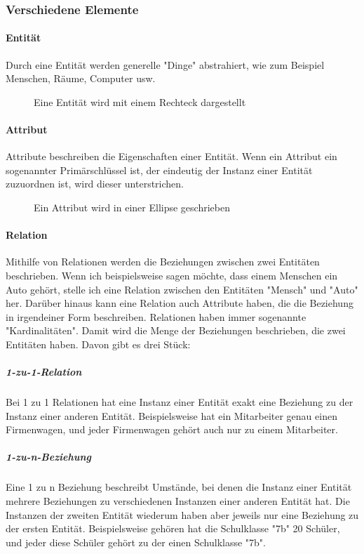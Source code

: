 \documentclass{article}
\begin{document}
	\subsubsection{Verschiedene Elemente}
	\paragraph{Entität}
	Durch eine Entität werden generelle "Dinge" abstrahiert, wie zum Beispiel Menschen, Räume, Computer usw.

	\begin{figure}[h!]
		\caption{Eine Entität wird mit einem Rechteck dargestellt}
	\end{figure}	

	\paragraph{Attribut}
	Attribute beschreiben die Eigenschaften einer Entität. Wenn ein Attribut ein sogenannter Primärschlüssel ist, der eindeutig der Instanz einer Entität zuzuordnen ist, wird dieser unterstrichen.

	\begin{figure}[h!]
		\centering
		
		\caption{Ein Attribut wird in einer Ellipse geschrieben}
	\end{figure}	

	\paragraph{Relation}
	Mithilfe von Relationen werden die Beziehungen zwischen zwei Entitäten beschrieben. Wenn ich beispielsweise sagen möchte, dass einem Menschen ein Auto gehört, stelle ich eine Relation zwischen den Entitäten "Mensch" und "Auto" her. Darüber hinaus kann eine Relation auch Attribute haben, die die Beziehung in irgendeiner Form beschreiben.
	Relationen haben immer sogenannte "Kardinalitäten". Damit wird die Menge der Beziehungen beschrieben, die zwei Entitäten haben. Davon gibt es drei Stück:

	\subparagraph{1-zu-1-Relation}
	Bei 1 zu 1 Relationen hat eine Instanz einer Entität exakt eine Beziehung zu der Instanz einer anderen Entität. Beispielsweise hat ein Mitarbeiter genau einen Firmenwagen, und jeder Firmenwagen gehört auch nur zu einem Mitarbeiter.

	\subparagraph{1-zu-n-Beziehung}
	Eine 1 zu n Beziehung beschreibt Umstände, bei denen die Instanz einer Entität mehrere Beziehungen zu verschiedenen Instanzen einer anderen Entität hat. Die Instanzen der zweiten Entität wiederum haben aber jeweils nur eine Beziehung zu der ersten Entität. Beispielsweise gehören hat die Schulklasse "7b" 20 Schüler, und jeder diese Schüler gehört zu der einen Schulklasse "7b".
\end{document}
